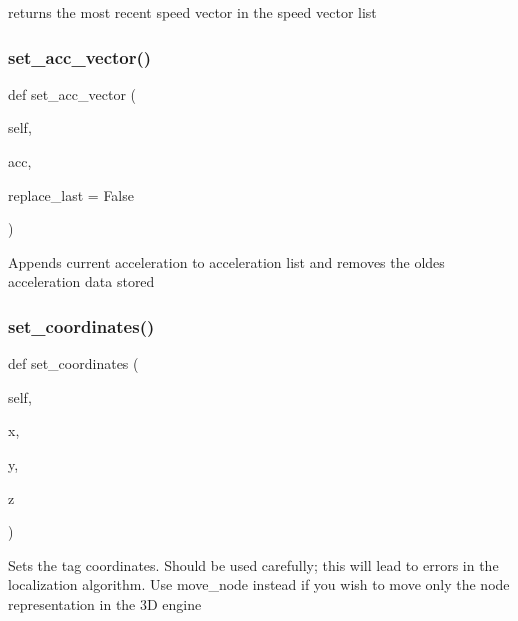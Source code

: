 \begin{DoxyVerb}returns the most recent speed vector in the speed vector list\end{DoxyVerb}
 \mbox{\label{classmovingentity_1_1_moving_entity_a42416d83ae7a1df561c13585f1389a6e}} 
\subsubsection{\texorpdfstring{set\+\_\+acc\+\_\+vector()}{set\_acc\_vector()}}
{\footnotesize\ttfamily def set\+\_\+acc\+\_\+vector (\begin{DoxyParamCaption}\item[{}]{self,  }\item[{}]{acc,  }\item[{}]{replace\+\_\+last = {\ttfamily False} }\end{DoxyParamCaption})}

\begin{DoxyVerb}Appends current acceleration to acceleration list and removes the oldes acceleration data stored\end{DoxyVerb}
 \mbox{\label{classmovingentity_1_1_moving_entity_afc59fd77ac0d0375226e77947f7f6624}} 
\subsubsection{\texorpdfstring{set\+\_\+coordinates()}{set\_coordinates()}}
{\footnotesize\ttfamily def set\+\_\+coordinates (\begin{DoxyParamCaption}\item[{}]{self,  }\item[{}]{x,  }\item[{}]{y,  }\item[{}]{z }\end{DoxyParamCaption})}

\begin{DoxyVerb}Sets the tag coordinates. Should be used carefully; this will lead to errors in the localization algorithm.
Use move_node instead if you wish to move only the node representation in the 3D engine\end{DoxyVerb}
 \mbox{\label{classmovingentity_1_1_moving_entity_a8c0cf2c98dee238d1694be0a9ac45d1c}} 

